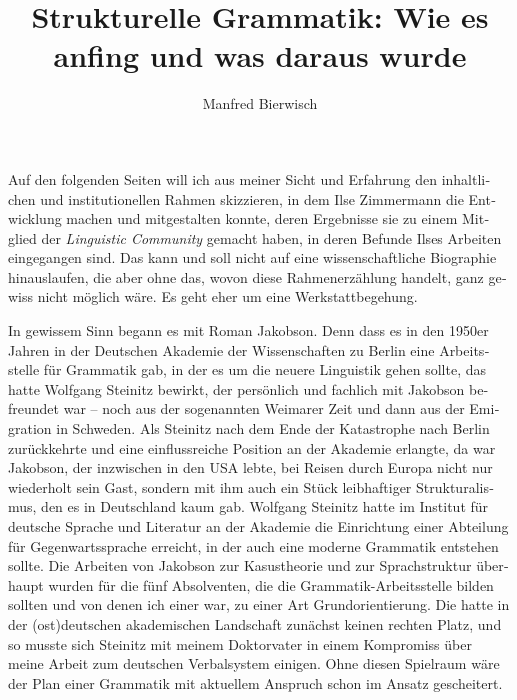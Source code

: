 \documentclass[output=paper,colorlinks,citecolor=brown]{langscibook}
\author{Manfred Bierwisch\affiliation{Leibniz-ZAS Berlin}\orcid{}}
\title[Strukturelle Grammatik: Wie es anfing und was daraus wurde]{Strukturelle Grammatik: Wie es anfing und was daraus wurde\\ \medskip {\LARGE Für Ilse Zimmermann}}
\begin{document}
\begin{otherlanguage}{german}
\maketitle


\bigskip

\noindent Auf den folgenden Seiten will ich aus meiner Sicht und Erfahrung den inhaltlichen und institutionellen Rahmen skizzieren, in dem Ilse Zimmermann die Entwicklung machen und mitgestalten konnte, deren Ergebnisse sie zu einem Mitglied der \textit{Linguistic Community} gemacht haben, in deren Befunde Ilses Arbeiten eingegangen sind. Das kann und soll nicht auf eine wissenschaftliche Biographie hinauslaufen, die aber ohne das, wovon diese Rahmenerzählung handelt, ganz gewiss nicht möglich wäre. Es geht eher um eine Werkstattbegehung.

In gewissem Sinn begann es mit Roman Jakobson. Denn dass es in den 1950er Jahren in der Deutschen Akademie der Wissenschaften zu Berlin eine Arbeitsstelle für Grammatik gab, in der es um die neuere Linguistik gehen sollte, das hatte Wolfgang Steinitz bewirkt, der persönlich und fachlich mit Jakobson befreundet war -- noch aus der sogenannten Weimarer Zeit und dann aus der Emigration in Schweden. Als Steinitz nach dem Ende der Katastrophe nach Berlin zurückkehrte und eine einflussreiche Position an der Akademie erlangte, da war Jakobson, der inzwischen in den USA lebte, bei Reisen durch Europa nicht nur wiederholt sein Gast, sondern mit ihm auch ein Stück leibhaftiger Strukturalismus, den es in Deutschland kaum gab. Wolfgang Steinitz hatte im Institut für deutsche Sprache und Literatur an der Akademie die Einrichtung einer Abteilung für Gegenwartssprache erreicht, in der auch eine moderne Grammatik entstehen sollte. Die Arbeiten von Jakobson zur Kasustheorie und zur Sprachstruktur überhaupt wurden für die fünf Absolventen, die die Grammatik-Arbeitsstelle bilden sollten und von denen ich einer war, zu einer Art Grundorientierung. Die hatte in der (ost)deutschen akademischen Landschaft zunächst keinen rechten Platz, und so musste sich Steinitz mit meinem Doktorvater in einem Kompromiss über meine Arbeit zum deutschen Verbalsystem einigen. Ohne diesen Spielraum wäre der Plan einer Grammatik mit aktuellem Anspruch schon im Ansatz gescheitert.


\end{otherlanguage}
\end{document}
